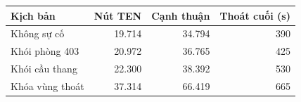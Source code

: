 \small\begin{tabular}{lrrr}
\toprule
Kịch bản & Nút TEN & Cạnh thuận & Thoát cuối (s)\\\midrule
Không sự cố & 19.714 & 34.794 & 390\\
Khói phòng 403 & 20.972 & 36.765 & 425\\
Khói cầu thang & 22.300 & 38.392 & 530\\
Khóa vùng thoát & 37.314 & 66.419 & 665\\
\bottomrule\end{tabular}
